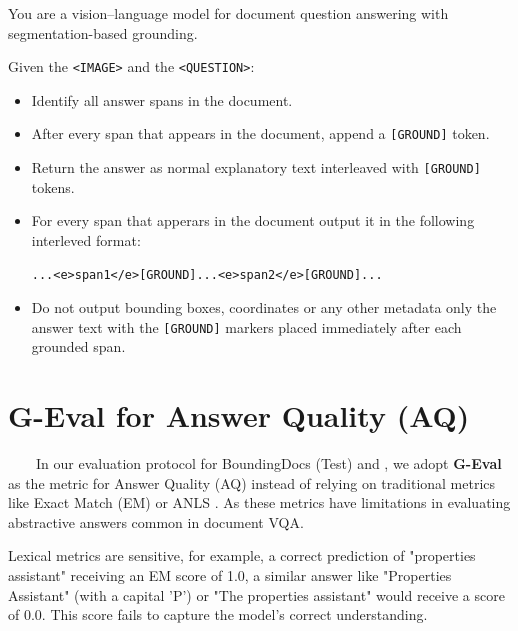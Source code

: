 \begin{tcolorbox}[baseline_prompt_style, title= \modelName-I and \modelName-Q]


You are a vision–language model for document question answering with segmentation-based grounding.

Given the \texttt{<IMAGE>} and the \texttt{<QUESTION>}: \\

\begin{itemize}[leftmargin=10pt]
    \item Identify all answer spans in the document. 
    \item After every span that appears in the document, append a \texttt{[GROUND]} token.
    \item Return the answer as normal explanatory text interleaved with \texttt{[GROUND]} tokens. 
    \item For every span that apperars in the document output it in the following interleved format: 

\begin{verbatim}
...<e>span1</e>[GROUND]...<e>span2</e>[GROUND]...
\end{verbatim}
    \item Do not output bounding boxes, coordinates or any other metadata only the answer text with the \texttt{[GROUND]} markers placed immediately after each grounded span.

\end{itemize}
\end{tcolorbox}


\section{G-Eval for Answer Quality (AQ)}
\label{sec:geval_justification}

~~~~In our evaluation protocol for BoundingDocs (Test) and \benchmarkName, we adopt \textbf{G-Eval}~\cite{liu2023geval} as the  metric for Answer Quality (AQ) instead of relying on traditional metrics like Exact Match (EM) \cite{rajpurkar-etal-2016-squad} or ANLS \cite{singh2019towards}. As these metrics have limitations in evaluating abstractive answers common in document VQA.

\noindent Lexical metrics are sensitive, for example, a correct prediction of "properties assistant" receiving an EM score of 1.0, a  similar answer like "Properties Assistant" (with a capital 'P') or "The properties assistant" would receive a score of 0.0. This score fails to capture the model's correct understanding.

